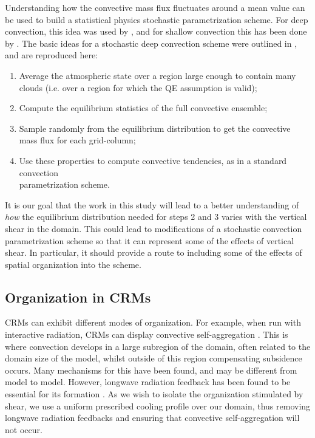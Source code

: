 \documentclass[11pt,a4paper]{article}
\begin{document}
Understanding how the convective mass flux fluctuates around a mean value can be used to build a statistical physics stochastic parametrization scheme. For deep convection, this idea was used by \cite{PC2008}, and for shallow convection this has been done by \cite{sakradzija2016stochastic}. The basic ideas for a stochastic deep convection scheme were outlined in \cite{PC2008}, and are reproduced here:

\begin{enumerate}
    \item Average the atmospheric state over a region large enough to contain many clouds (i.e. over a region for which the QE assumption is valid);
    \item Compute the equilibrium statistics of the full convective ensemble;
    \item Sample randomly from the equilibrium distribution to get the convective mass flux for each grid-column;
    \item Use these properties to compute convective tendencies, as in a standard convection\\parametrization scheme.
\end{enumerate}

It is our goal that the work in this study will lead to a better understanding of \textit{how} the equilibrium distribution needed for steps 2 and 3 varies with the vertical shear in the domain. This could lead to modifications of a stochastic convection parametrization scheme so that it can represent some of the effects of vertical shear. In particular, it should provide a route to including some of the effects of spatial organization into the scheme. 

\subsection{Organization in CRMs}
CRMs can exhibit different modes of organization. For example, when run with interactive radiation, CRMs can display convective self-aggregation \parencite{wing2017convective}. 
This is where convection develops in a large subregion of the domain, often related to the domain size of the model, whilst outside of this region compensating subsidence occurs. Many mechanisms for this have been found, and may be different from model to model. 
However, longwave radiation feedback has been found to be essential for its formation \parencite{wing2017convective}. As we wish to isolate the organization stimulated by shear, we use a uniform prescribed cooling profile over our domain, thus removing longwave radiation feedbacks and ensuring that convective self-aggregation will not occur.
\end{document}
